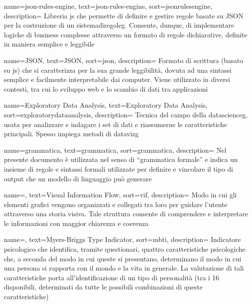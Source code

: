  {
    name=json-rules-engine,
    text=json-rules-engine,
    sort=jsonrulesengine,
    description=
    {Libreria \gls{js} che permette di definire e gestire regole basate su JSON per la costruzione di un \gls{sistemadiregoleg}.
    Consente, dunque, di implementare logiche di business complesse attraverso un formato di regole dichiarative, definite in maniera semplice e leggibile}
}

 {
    name=JSON,
    text=JSON,
    sort=json,
    description=
    {Formato di scrittura (basato su \gls{js}) che si caratterizza per la sua grande leggibilità, dovuta ad una sintassi semplice e facilmente interpretabile dai computer. 
    Viene utilizzato in diversi contesti, tra cui lo sviluppo web e lo scambio di dati tra applicazioni}
}

 {
    name=Exploratory Data Analysis,
    text=Exploratory Data Analysis,
    sort=exploratorydataanalysis,
    description=
    {Tecnica del campo della \gls{datascienceg}, usata per analizzare e indagare i set di dati e riassumerne le caratteristiche principali.
    Spesso impiega metodi di \gls{datavizg}}
}

 {
    name=grammatica,
    text=grammatica,
    sort=grammatica,
    description=
    {Nel presente documento è utilizzata nel senso di ``grammatica formale'' e indica un insieme di regole e sintassi formali utilizzate per 
    definire e vincolare il tipo di output che un modello di linguaggio può generare}
}

 {
    name=,
    text=Visual Information Flow,
    sort=vif,
    description=
    {Modo in cui gli elementi grafici vengono organizzati e collegati tra loro per guidare l'utente attraverso una storia visiva. 
    Tale struttura consente di comprendere e interpretare le informazioni con maggior chiarezza e coerenza}
}


 {
    name=,
    text=Myers-Briggs Type Indicator,
    sort=mbti,
    description=
    {Indicatore psicologico che identifica, tramite questionari, quattro caratteristiche psicologiche che, a seconda del modo in cui queste si presentano, 
    determinano il modo in cui una persona si rapporta con il mondo e la vita in generale.
    La valutazione di tali caratteristiche porta all'identificazione di un tipo di personalità (tra i 16 disponibili, determinati da tutte 
    le possibili combinazioni di queste caratteristiche)}
}

